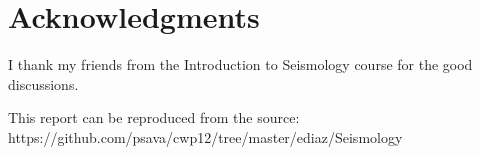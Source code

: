 \section{Acknowledgments}
I thank my friends from the Introduction to Seismology course for the good discussions.
%

This report can be reproduced from the source: https://github.com/psava/cwp12/tree/master/ediaz/Seismology
